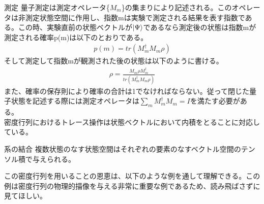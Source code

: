 \documentclass[a4paper,10.5pt]{article}
\numberwithin{equation}{section}
\begin{document}
\begin{defbox}{測定}
量子測定は測定オペレータ\{$M_{m}$\}の集まりにより記述される。このオペレータは非測定状態空間に作用し、指数mは実験で測定される結果を表す指数である。この時、実験直前の状態ベクトルが$\ket{\Psi}$であるなら測定後の状態は指数mが測定される確率p(m)は以下のとおりである。\\
 \begin{equation}\begin{split}
     p(m) = tr(M_{m}^{\dagger}M_{m}\rho) 
 \end{split} \end{equation}
 そして測定して指数mが観測された後の状態は以下のように書ける。
 \begin{equation}\begin{split}
     \rho = \frac{M_{m}\rho M_{m}^{\dagger}}{tr(M_{m}^{\dagger}M_{m}\rho)}
 \end{split} \end{equation}
また、確率の保存則により確率の合計は1でなければならない。従って閉じた量子状態を記述する際には測定オペレータは$\sum_{m}M_{m}^{\dagger} M_{m}=I$を満たす必要がある。\\
密度行列におけるトレース操作は状態ベクトルにおいて内積をとることに対応している。
\end{defbox}
\begin{defbox}{系の結合}
 複数状態のなす状態空間はそれぞれの要素のなすベクトル空間のテンソル積で与えられる。
\end{defbox}
この密度行列を用いることの恩恵は、以下のような例を通して理解できる。この例は密度行列の物理的描像を与える非常に重要な例であるため、読み飛ばさずに見てほしい。
\end{document}
